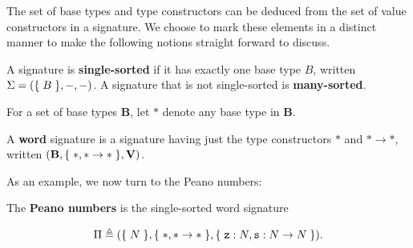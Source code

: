 The set of base types and type constructors can be deduced from the set of
value constructors in a signature. We choose to mark these elements in a
distinct manner to make the following notions straight forward to discuss.

\begin{definition} A signature is \textbf{single-sorted} if it has exactly one
base type $B$, written $\Sigma = {\mathopen{}\left({\mathopen{}\left\{\mathrel{}{B}\mathrel{}\right\}\mathclose{}, -, -}\right)\mathclose{}}$. A signature that is not
single-sorted is \textbf{many-sorted}.  \end{definition}

\begin{definition} For a set of base types $\mathbf{B}$, let $*$ denote any
base type in $\mathbf{B}$. \end{definition}

\begin{definition} A \textbf{word} signature is a signature having just the
type constructors $*$ and $* \rightarrow *$, written ${\mathopen{}\left({\mathbf{B}, \mathopen{}\left\{\mathrel{}{*, *
\rightarrow *}\mathrel{}\right\}\mathclose{}, \mathbf{V}}\right)\mathclose{}}$.  \end{definition}


As an example, we now turn to the Peano numbers:

\begin{definition} The \textbf{Peano numbers} is the single-sorted word
signature

$$\Pi \triangleq {\ensuremath{\mathopen{}\left({\mathopen{}\left\{\mathrel{}{N}\mathrel{}\right\}\mathclose{}, \mathopen{}\left\{\mathrel{}{*, * \rightarrow *}\mathrel{}\right\}\mathclose{}, \mathopen{}\left\{\mathrel{}{\mathtt{z} : N,
\mathtt{s} : N \rightarrow N}\mathrel{}\right\}\mathclose{}}\right)\mathclose{}}}.$$

\end{definition}



